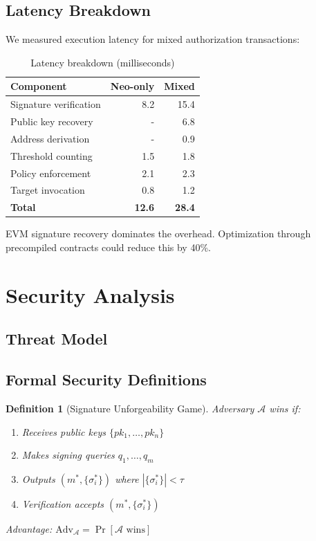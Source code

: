 \documentclass[10pt,twocolumn]{article}
\newtheorem{definition}{Definition}
\begin{document}
\subsection{Latency Breakdown}

We measured execution latency for mixed authorization transactions:

\begin{table}[h]
\centering
\caption{Latency breakdown (milliseconds)}
\begin{tabular}{@{}lrr@{}}
\toprule
Component & Neo-only & Mixed \\
\midrule
Signature verification & 8.2 & 15.4 \\
Public key recovery & - & 6.8 \\
Address derivation & - & 0.9 \\
Threshold counting & 1.5 & 1.8 \\
Policy enforcement & 2.1 & 2.3 \\
Target invocation & 0.8 & 1.2 \\
\textbf{Total} & \textbf{12.6} & \textbf{28.4} \\
\bottomrule
\end{tabular}
\end{table}

EVM signature recovery dominates the overhead. Optimization through precompiled contracts could reduce this by 40\%.

\section{Security Analysis}

\subsection{Threat Model}

\subsection{Formal Security Definitions}

\begin{definition}[Signature Unforgeability Game]
Adversary $\mathcal{A}$ wins if:
\begin{enumerate}[leftmargin=*,topsep=2pt,itemsep=1pt]
\item Receives public keys $\{pk_1, \ldots, pk_n\}$
\item Makes signing queries $q_1, \ldots, q_m$
\item Outputs $(m^*, \{\sigma_i^*\})$ where $|\{\sigma_i^*\}| < \tau$
\item Verification accepts $(m^*, \{\sigma_i^*\})$
\end{enumerate}
Advantage: $\text{Adv}_{\mathcal{A}} = \Pr[\mathcal{A} \text{ wins}]$
\end{definition}
\end{document}
